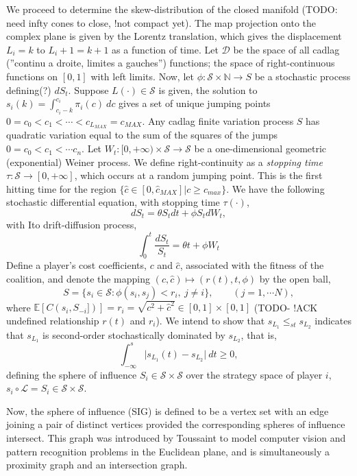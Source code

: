 \documentclass[10pt]{article}
\newcommand{\mcL}{\mathcal{L}}
\newcommand{\mcS}{\mathcal{S}}
\newcommand{\mcD}{\mathcal{D}}
\theoremstyle{definition}
\begin{document}
We proceed to determine the skew-distribution of the closed manifold (TODO: need
infty cones to close, !not compact yet). The map projection onto the complex plane is given by the Lorentz translation, which gives the displacement $L_i = k$ to $L_i+1 = k +1$ as a function of time.
Let $\mcD$ be the space of all cadlag (”continu a droite, limites a gauches”)
functions; the space of right-continuous functions on $[0, 1]$ with left limits.
Now, let $\phi:\mcS\times \mathbb{N} \rightarrow S$ be a stochastic process
defining(?) $dS_t$. Suppose $L(\cdot)\in \mcS$ is given, the solution to
$s_i(k) = \int_{c_i - k}^{c_i} \pi_i(c) \ dc$ gives a set of unique jumping points $0=c_0<
c_1< \cdots < c_{L_{MAX}} = c_{MAX}$. 
Any cadlag finite variation process $S$ has quadratic variation equal to the sum
of the squares of the jumps $0=c_0<c_1<\cdots c_n$.
Let $W_t: [0, +\infty) \times \mcS \rightarrow \mcS$ be a
one-dimensional geometric (exponential) Weiner process. We define right-continuity as 
a \emph{stopping time} $\tau:\mcS \rightarrow [0,+\infty]$, which occurs at a random jumping point. This is the first hitting time
for the region $\lbrace \hat c \in [0,\hat c_{MAX}] \vert c \ge c_{max}\rbrace$.
We have the following stochastic differential equation, with stopping time
$\tau(\cdot)$,
$$
    dS_t = \theta S_t dt + \phi S_t dW_t,
$$
with Ito drift-diffusion process,
$$
    \displaystyle\int_0^t \frac{dS_t}{S_t} = \theta t + \phi W_t
$$
Define a player’s cost coefficients, $c$ and $\hat c$, associated with the
fitness of the coalition, and denote the mapping $(c, \hat c) \mapsto (r(t), t, \phi)$ by the open ball,
$$
    S = \lbrace s_i \in \mcS : \phi(s_i, s_j) < r_i, \ j\ne i \rbrace, \qquad (j
    = 1, \cdots N),
$$
where $\mathbb{E}[C(s_i, S_{-i}])] = r_i = \sqrt{c^2 + \hat c^2} \in [0,1]\times
[0,1]$ (TODO- !ACK undefined relationship $r(t)$ and $r_i$).
We intend to show that $s_{L_1} \le_{st} s_{L_2}$ indicates that $s_{L_1}$ is second-order stochastically dominated by $s_{L_2}$, that is, 
$$
    \displaystyle\int_{-\infty}^s\vert s_{L_1}(t) - s_{L_2} \vert \ dt \ge 0,
$$
defining the sphere of influence $S_i \in \mcS\times\mcS$ over the strategy
space of player $i$, $s_i\circ\mcL = S_i \in \mcS\times\mcS$.

Now, the sphere of influence (SIG) is defined to be a vertex set with an edge joining
a pair of distinct vertices provided the corresponding spheres of influence intersect. This graph was introduced by Toussaint to model computer vision and pattern recognition problems in the
Euclidean plane, and is simultaneously a proximity graph and an intersection graph.
\end{document}
